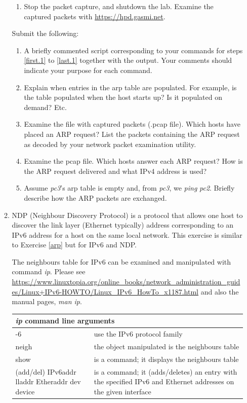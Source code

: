 \documentclass[12pt]{book}
\begin{document}
\begin{enumerate}[label=\arabic*.]
\begin{enumerate}[label=\arabic*.]
\begin{enumerate}[label=(\roman*)]
  \item\label{last.1} Stop the packet capture, and shutdown the lab. Examine the captured packets with   \url{https://hpd.gasmi.net}.
  \end{enumerate}

  Submit the following:
  \begin{enumerate}[label=(\alph*)]
  \item A briefly commented script corresponding to your commands for steps \ref{first.1} to \ref{last.1} together with the output. Your comments should indicate your purpose for each command.
  \item Explain when entries in the arp table are populated. For example, is the table populated when the host starts up? Is it populated on demand? Etc.
  \item Examine the file with captured packets (.pcap file). Which hosts have placed an ARP request? List the packets containing the ARP request as decoded     by your network packet examination utility.
    \item Examine the pcap file. Which hosts answer each ARP request?
      How is the ARP request delivered and what IPv4
      address is used?
  \item Assume \emph{pc3}'s arp table is empty and, from \emph{pc3}, we \emph{ping} \emph{pc2}. Briefly describe how the ARP packets are exchanged. 
  \end{enumerate}

\item NDP (Neighbour Discovery Protocol) is a protocol that allows one host to discover the link layer (Ethernet typically) address corresponding to an IPv6 address for a host on the same local network. This exercise is similar to Exercise \ref{arp} but for IPv6 and NDP.

The neighbours table for IPv6 can be examined and manipulated with command \emph{ip}. Please see \url{https://www.linuxtopia.org/online_books/network_administration_guides/Linux+IPv6-HOWTO/Linux_IPv6_HowTo_x1187.html} and also the manual pages, \emph{man ip}.

\smallskip
\begin{tabularx}{0.9\textwidth}{p{5cm} X} \toprule
  \multicolumn{2}{l}{\emph{ip} command line arguments} \\ \midrule
  -6 & use the IPv6 protocol family \\
  neigh & the object manipulated is the neighbours table \\
  show & is a command; it displays the neighbours table \\
  (add/del) IPv6addr lladdr Etheraddr dev device & is a command; it  (adds/deletes) an entry with the specified IPv6 and Ethernet addresses on the given interface\\ \bottomrule
  \end{tabularx}
\smallskip


\end{enumerate}
\end{enumerate}
\end{document}
